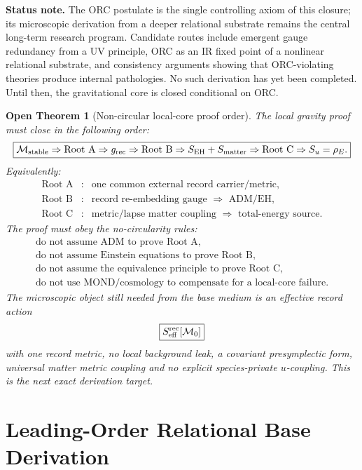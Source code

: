 \documentclass[11pt]{article}
\newtheorem{openthm}{Open Theorem}
\begin{document}
\noindent\textbf{Status note.}
The ORC postulate is the single controlling axiom of this closure; its
microscopic derivation from a deeper relational substrate remains the
central long-term research program.  Candidate routes include emergent
gauge redundancy from a UV principle, ORC as an IR fixed point of a
nonlinear relational substrate, and consistency arguments showing that
ORC-violating theories produce internal pathologies.  No such derivation
has yet been completed.  Until then, the gravitational core is closed
conditional on ORC.

\begin{openthm}[Non-circular local-core proof order]
The local gravity proof must close in the following order:
\[
\boxed{
\mathcal M_{\rm stable}
\Rightarrow
\text{Root A}
\Rightarrow
g_{\rm rec}
\Rightarrow
\text{Root B}
\Rightarrow
S_{\rm EH}+S_{\rm matter}
\Rightarrow
\text{Root C}
\Rightarrow
S_u=\rho_E.
}
\]
Equivalently:
\[
\boxed{
\begin{array}{rcl}
\text{Root A} &:& \text{one common external record carrier/metric},\\
\text{Root B} &:& \text{record re-embedding gauge }\Rightarrow\text{ ADM/EH},\\
\text{Root C} &:& \text{metric/lapse matter coupling }\Rightarrow\text{ total-energy source}.
\end{array}
}
\]
The proof must obey the no-circularity rules:
\[
\boxed{
\begin{array}{l}
\text{do not assume ADM to prove Root A},\\
\text{do not assume Einstein equations to prove Root B},\\
\text{do not assume the equivalence principle to prove Root C},\\
\text{do not use MOND/cosmology to compensate for a local-core failure}.
\end{array}
}
\]
The microscopic object still needed from the base medium is an effective record
action
\[
\boxed{
S_{\rm eff}^{\rm rec}[\mathcal M_0]
}
\]
with one record metric, no local background leak, a covariant presymplectic
form, universal matter metric coupling and no explicit species-private
\(u\)-coupling.  This is the next exact derivation target.
\end{openthm}

\section{Leading-Order Relational Base Derivation}
\end{document}
